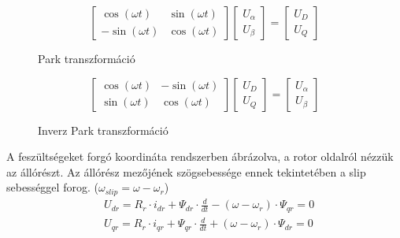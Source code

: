 \documentclass[a4paper,12pt]{article}
\begin{document}
		\begin{figure}	
			\begin{equation*}
				\renewcommand\arraystretch{1.5} %
				\begin{bmatrix}
					\cos(\omega t) & \sin(\omega t)\\
				   -\sin(\omega t) & \cos(\omega t)
				\end{bmatrix}
				\begin{bmatrix}
					U_{\alpha}\\
					U_{\beta } 
				\end{bmatrix}
				=
				\begin{bmatrix}
					U_{D} \\
					U_{Q}
				\end{bmatrix}
			\end{equation*}
		\caption{Park transzformáció}
	 	\end{figure}
	 	
	 	\begin{figure}	
	 		\begin{equation*}
	 			\renewcommand\arraystretch{1.5} %
	 			\begin{bmatrix}
	 				\cos(\omega t) & -\sin(\omega t)\\
	 				\sin(\omega t) &  \cos(\omega t)
	 			\end{bmatrix}
	 			\begin{bmatrix}
	 				U_{D}\\
	 				U_{Q } 
	 			\end{bmatrix}
	 			=
	 			\begin{bmatrix}
	 				U_{\alpha} \\
	 				U_{\beta}
	 			\end{bmatrix}
	 		\end{equation*}
	 		\caption{Inverz Park transzformáció}
	 	\end{figure}
		
		\pagebreak
		A feszültségeket forgó koordináta rendszerben ábrázolva, a rotor oldalról nézzük az állórészt. Az állórész mezőjének szögsebessége ennek tekintetében a slip sebességgel forog. ($ \omega_{slip} = \omega - \omega_{r} $)
		\begin{align}
			& U_{dr} = R_r \cdot i_{dr} + \Psi_{dr} \cdot \frac{d}{dt} - (\omega - \omega_{r}) \cdot \Psi_{qr} = 0 \\
			& U_{qr} = R_r \cdot i_{qr} + \Psi_{qr} \cdot \frac{d}{dt} + (\omega - \omega_{r}) \cdot \Psi_{dr} = 0
		\end{align}
		
\end{document}
